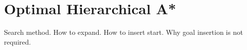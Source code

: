 \section{Optimal Hierarchical A*}
Search method.
How to expand.
How to insert start.
Why goal insertion is not required.

